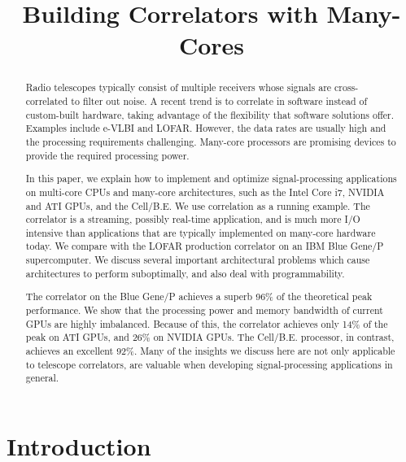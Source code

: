 \documentclass{article}
\title{Building Correlators with Many-Cores}
\begin{document}
\maketitle

\begin{abstract}
Radio telescopes typically consist of multiple receivers whose
signals are cross-correlated to filter out noise.  A recent trend
is to correlate in software instead of custom-built hardware, taking
advantage of the flexibility that software solutions offer.  Examples
include e-VLBI and LOFAR.  However, the data rates are usually high
and the processing requirements challenging.  Many-core processors are
promising devices to provide the required processing power.

In this paper, we explain how to implement and optimize
signal-processing applications on multi-core CPUs and many-core
architectures, such as the Intel Core i7, NVIDIA and ATI GPUs, and the
\mbox{Cell/B.E.}  We use correlation as a running example. The
correlator is a streaming, possibly real-time application, and is much
more I/O intensive than applications that are typically implemented on
many-core hardware today.  We compare with the LOFAR production
correlator on an IBM Blue Gene/P supercomputer.  We discuss several
important architectural problems which cause architectures to perform
suboptimally, and also deal with programmability.

The correlator on the Blue Gene/P achieves a superb 96\% of the
theoretical peak performance.  We show that the processing power and
memory bandwidth of current GPUs are highly imbalanced. Because of
this, the correlator achieves only 14\% of the peak on ATI GPUs, and
26\% on NVIDIA GPUs.  The \mbox{Cell/B.E.} processor, in contrast,
achieves an excellent 92\%.  Many of the insights we discuss here are not only
applicable to telescope correlators, are valuable when developing
signal-processing applications in general.
\end{abstract}


\section{Introduction}

\end{document}
